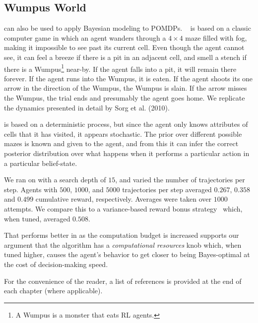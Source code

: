 \subsection{Wumpus World}

 can also be used to apply Bayesian modeling to POMDPs. ~\cite{russell94} is based on a classic computer game in which an agent wanders through a $4\times 4$ maze filled with fog, making it impossible to see past its current cell. Even though the agent cannot see, it can feel a breeze if there is a pit in an adjacent cell, and smell a stench if there is a Wumpus\footnote{A Wumpus is a monster that eats RL agents.} near-by. If the agent falls into a pit, it will remain there forever. If the agent runs into the Wumpus, it is eaten. If the agent shoots its one arrow in the direction of the Wumpus, the Wumpus is slain. If the arrow misses the Wumpus, the trial ends and presumably the agent goes home. We replicate the dynamics presented in detail by Sorg et al. (2010). %

 is based on a deterministic process, but since the agent only knows attributes of cells that it has visited, it appears stochastic. The prior over different possible mazes is known and given to the agent, and from this it can infer the correct posterior distribution over what happens when it performs a particular action in a particular belief-state.

We ran  on  with a search depth of $15$, and varied the number of trajectories per step. Agents with $500$, $1000$, and $5000$ trajectories per step averaged $0.267$, $0.358$ and $0.499$ cumulative reward, respectively. Averages were taken over $1000$ attempts. We compare this to a variance-based reward bonus strategy~\cite{sorg10} which, when tuned, averaged $0.508$.

That  performs better in  as the computation budget is increased supports our argument that the algorithm has a \emph{computational resources} knob which, when tuned higher, causes the agent's behavior to get closer to being Bayes-optimal at the cost of decision-making speed.

%
\ifperchapterbib%
For the convenience of the reader, a list of references is provided at the end of each chapter (where applicable).
\ifendbib%
\else\fi%
\else\fi%
